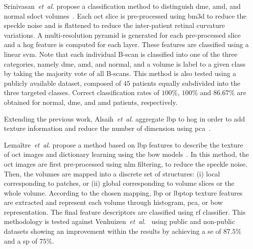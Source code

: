 %
Srinivasan~\textit{et~al.} propose a classification method to distinguish \gls{dme}, \gls{amd}, and normal \gls{sdoct} volumes~\cite{Srinivasan2014}.
%
Each \gls{oct} slice is pre-processed using \gls{bm3d} to reduce the speckle noise and is flattened to reduce the inter-patient retinal curvature variations.
A multi-resolution pyramid is generated for each pre-processed slice and a \gls{hog} feature is computed for each layer.
These features are classified using a linear \gls{svm}.
Note that each individual B-scan is classified into one of the three categories, namely \gls{dme}, \gls{amd}, and normal, and a volume is label to a given class by taking the majority vote of all B-scans.
%
This method is also tested using a publicly available dataset, composed of $45$ patients equally subdivided into the three targeted classes.
Correct classification rates of $100 \%$, $100 \%$ and $86.67 \%$ are obtained for normal, \gls{dme}, and \gls{amd} patients, respectively.

Extending the previous work, Alsaih~\emph{et~al.} aggregate \gls{lbp} to \gls{hog} in order to add texture information and reduce the number of dimension using \gls{pca}~\cite{Alsaih2016apr-repoICPR}.

Lema\^itre~\emph{et~al.} propose a method based on \gls{lbp} features to describe the texture of \gls{oct} images and dictionary learning using the \gls{bow} models~\cite{Lemaintre2015miccaiOCT}.
In this method, the \gls{oct} images are first pre-processed using \gls{nlm} filtering, to reduce the speckle noise.
Then, the volumes are mapped into a discrete set of structures: (i) local corresponding to patches, or (ii) global corresponding to volume slices or the whole volume.
According to the chosen mapping, \gls{lbp} or \gls{lbptop} texture features are extracted and represent each volume through histogram, \gls{pca}, or \gls{bow} representation.
The final feature descriptors are classified using \gls{rf} classifier.
This methodology is tested against Venhuizen~\textit{et~al.}~\cite{Venhuizen2015} using public and non-public datasets showing an improvement within the results by achieving a \gls{se} of $87.5 \%$ and a \gls{sp} of $75 \%$.

